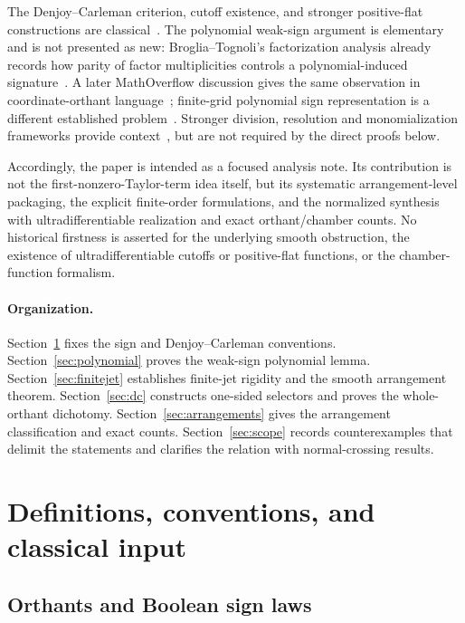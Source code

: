 \documentclass[11pt]{article}
\theoremstyle{definition}
\theoremstyle{remark}
\begin{document}
The Denjoy--Carleman criterion, cutoff existence, and stronger positive-flat constructions are classical~\cite{Rainer2022,Langenbruch2003,Thilliez2008}. The polynomial weak-sign argument is elementary and is not presented as new: Broglia--Tognoli's factorization analysis already records how parity of factor multiplicities controls a polynomial-induced signature~\cite[Proposition~2.4]{BrogliaTognoli1989}. A later MathOverflow discussion gives the same observation in coordinate-orthant language~\cite{MathOverflow2014}; finite-grid polynomial sign representation is a different established problem~\cite{BasuEtAl2008}. Stronger division, resolution and monomialization frameworks provide context~\cite{BelottoBierstoneChow2018,BierstoneMilman2004,BelottoBierstone2023}, but are not required by the direct proofs below.

Accordingly, the paper is intended as a focused analysis note. Its contribution is not the first-nonzero-Taylor-term idea itself, but its systematic arrangement-level packaging, the explicit finite-order formulations, and the normalized synthesis with ultradifferentiable realization and exact orthant/chamber counts. No historical firstness is asserted for the underlying smooth obstruction, the existence of ultradifferentiable cutoffs or positive-flat functions, or the chamber-function formalism.

\paragraph{Organization.}
Section~\ref{sec:setup} fixes the sign and Denjoy--Carleman conventions. Section~\ref{sec:polynomial} proves the weak-sign polynomial lemma. Section~\ref{sec:finitejet} establishes finite-jet rigidity and the smooth arrangement theorem. Section~\ref{sec:dc} constructs one-sided selectors and proves the whole-orthant dichotomy. Section~\ref{sec:arrangements} gives the arrangement classification and exact counts. Section~\ref{sec:scope} records counterexamples that delimit the statements and clarifies the relation with normal-crossing results.

\section{Definitions, conventions, and classical input}\label{sec:setup}

\subsection{Orthants and Boolean sign laws}
\end{document}
